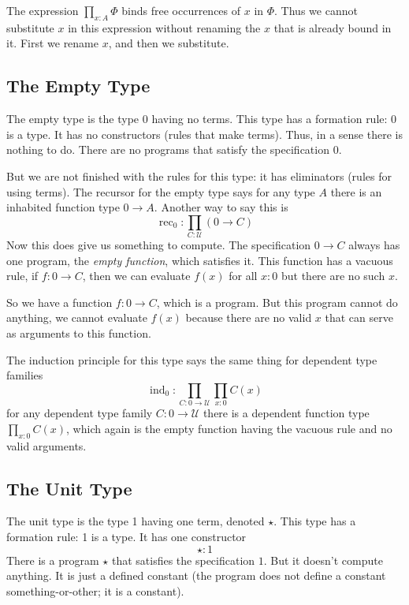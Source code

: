 \documentclass[11pt]{article}
\DeclareMathOperator{\inductor}{ind}
\DeclareMathOperator{\recursor}{rec}
\newcommand{\universe}{\mathcal{U}}
\begin{document}
The expression $\prod_{x : A} \Phi$ binds free occurrences of $x$ in $\Phi$.
Thus we cannot substitute $x$ in this expression without renaming the $x$
that is already bound in it.  First we rename $x$, and then we substitute.

\subsection{The Empty Type}

The empty type  is the type $0$ having
no terms.  This type has a formation rule: 0 is a type.
It has no constructors (rules that make terms).  Thus, in a sense there is
nothing to do.  There are no programs that satisfy the specification $0$.

But we are not finished with the rules for this type: it has eliminators
(rules for using terms).
The recursor for the empty type says for any type $A$ there is an
inhabited function type $0 \to A$.  Another way to say this is
$$
   \recursor_0 : \prod_{C : \universe} (0 \to C)
$$
Now this does give us something to compute.  The specification $0 \to C$
always has one program, the \emph{empty function}, which satisfies it.
This function has a vacuous rule, if $f : 0 \to C$, then we can evaluate
$f(x)$ for all $x : 0$ but there are no such $x$.

So we have a function $f : 0 \to C$, which is a program.  But this program
cannot do anything, we cannot evaluate $f(x)$ because there are no valid
$x$ that can serve as arguments to this function.

The induction principle for this type says the same thing for
dependent type families
$$
   \inductor_0 : \prod_{C : 0 \to \universe} \prod_{x : 0} C(x)
$$
for any dependent type family $C : 0 \to \universe$ there is
a dependent function type $\prod_{x : 0} C(x)$, which again is the
empty function having the vacuous rule and no valid arguments.

\subsection{The Unit Type}

The unit type  is the type 1
having one term, denoted $\star$.  This type has a formation rule: 1 is a type.
It has one constructor
$$
   \star : 1
$$
There is a program $\star$ that satisfies the specification $1$.
But it doesn't compute anything.  It is just a defined constant
(the program does not define a constant something-or-other; it is a constant).
\end{document}
